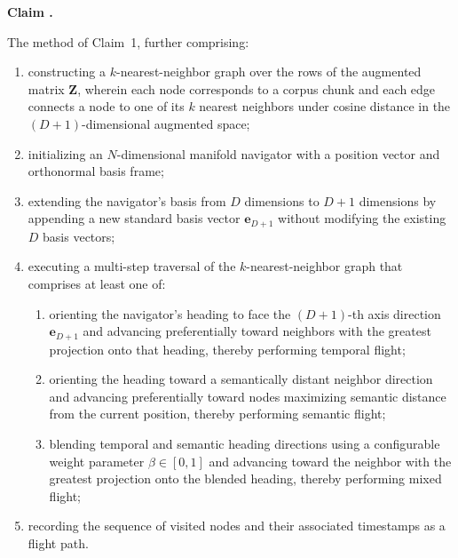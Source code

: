 \documentclass[12pt,letterpaper]{article}
\newcounter{claimcounter}
\newenvironment{claim}{%
  \refstepcounter{claimcounter}%
  \noindent\textbf{Claim \theclaimcounter.}\ %
}{%
  \par\medskip%
}
\begin{document}
\begin{claim}
The method of Claim~1, further comprising:

\begin{enumerate}[label=(\alph*), noitemsep]
  \item constructing a $k$-nearest-neighbor graph over the rows of the
    augmented matrix $\mathbf{Z}$, wherein each node corresponds to a corpus
    chunk and each edge connects a node to one of its $k$ nearest neighbors
    under cosine distance in the $(D+1)$-dimensional augmented space;

  \item initializing an $N$-dimensional manifold navigator with a position
    vector and orthonormal basis frame;

  \item extending the navigator's basis from $D$ dimensions to $D+1$
    dimensions by appending a new standard basis vector $\mathbf{e}_{D+1}$
    without modifying the existing $D$ basis vectors;

  \item executing a multi-step traversal of the $k$-nearest-neighbor graph
    that comprises at least one of:
    \begin{enumerate}[label=(\roman*), noitemsep]
      \item orienting the navigator's heading to face the $(D+1)$-th axis
        direction $\mathbf{e}_{D+1}$ and advancing preferentially toward
        neighbors with the greatest projection onto that heading, thereby
        performing temporal flight;
      \item orienting the heading toward a semantically distant neighbor
        direction and advancing preferentially toward nodes maximizing
        semantic distance from the current position, thereby performing
        semantic flight;
      \item blending temporal and semantic heading directions using a
        configurable weight parameter $\beta \in [0, 1]$ and advancing
        toward the neighbor with the greatest projection onto the blended
        heading, thereby performing mixed flight;
    \end{enumerate}

  \item recording the sequence of visited nodes and their associated
    timestamps as a flight path.
\end{enumerate}
\end{claim}
\end{document}
